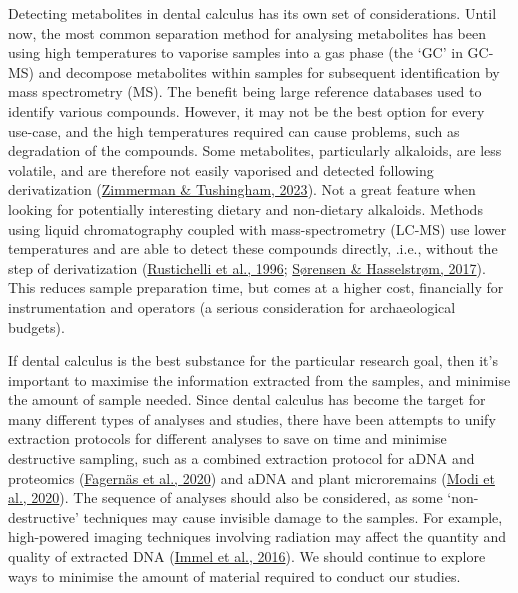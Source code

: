 \documentclass[
  letterpaper,
]{book}
\begin{document}
Detecting metabolites in dental calculus has its own set of
considerations. Until now, the most common separation method for
analysing metabolites has been using high temperatures to vaporise
samples into a gas phase (the `GC' in GC-MS) and decompose metabolites
within samples for subsequent identification by mass spectrometry (MS).
The benefit being large reference databases used to identify various
compounds. However, it may not be the best option for every use-case,
and the high temperatures required can cause problems, such as
degradation of the compounds. Some metabolites, particularly alkaloids,
are less volatile, and are therefore not easily vaporised and detected
following derivatization
(\protect\hyperlink{ref-zimmermanBiomolecularArchaeology2023}{Zimmerman
\& Tushingham, 2023}). Not a great feature when looking for potentially
interesting dietary and non-dietary alkaloids. Methods using liquid
chromatography coupled with mass-spectrometry (LC-MS) use lower
temperatures and are able to detect these compounds directly, .i.e.,
without the step of derivatization
(\protect\hyperlink{ref-rustichelliSimultaneousSeparation1996}{Rustichelli
et al., 1996};
\protect\hyperlink{ref-sorensenSensitiveDetermination2017}{Sørensen \&
Hasselstrøm, 2017}). This reduces sample preparation time, but comes at
a higher cost, financially for instrumentation and operators (a serious
consideration for archaeological budgets).

If dental calculus is the best substance for the particular research
goal, then it's important to maximise the information extracted from the
samples, and minimise the amount of sample needed. Since dental calculus
has become the target for many different types of analyses and studies,
there have been attempts to unify extraction protocols for different
analyses to save on time and minimise destructive sampling, such as a
combined extraction protocol for aDNA and proteomics
(\protect\hyperlink{ref-fagernasUnifiedProtocol2020}{Fagernäs et al.,
2020}) and aDNA and plant microremains
(\protect\hyperlink{ref-modiCalculusMethodologies2020}{Modi et al.,
2020}). The sequence of analyses should also be considered, as some
`non-destructive' techniques may cause invisible damage to the samples.
For example, high-powered imaging techniques involving radiation may
affect the quantity and quality of extracted DNA
(\protect\hyperlink{ref-immelEffectXray2016}{Immel et al., 2016}). We
should continue to explore ways to minimise the amount of material
required to conduct our studies.
\end{document}
